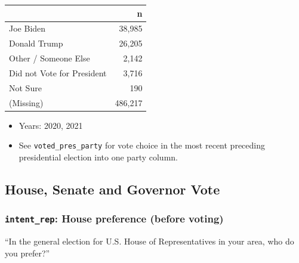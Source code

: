 \documentclass[10pt,article,oneside]{memoir}
\theoremstyle{definition}
\begin{document}
\begin{table}[H]
\centering
\begin{tabular}[t]{lr}
\toprule
 & n\\
\midrule
Joe Biden & 38,985\\
Donald Trump & 26,205\\
Other / Someone Else & 2,142\\
Did not Vote for President & 3,716\\
Not Sure & 190\\
(Missing) & 486,217\\
\bottomrule
\end{tabular}
\end{table}

\begin{itemize}
\tightlist
\item
  Years: 2020, 2021
\item
  See \texttt{voted\_pres\_party} for vote choice in the most recent
  preceding presidential election into one party column.
\end{itemize}

\hypertarget{house-senate-and-governor-vote}{%
\subsection{House, Senate and Governor
Vote}\label{house-senate-and-governor-vote}}

\hypertarget{intent_rep-house-preference-before-voting}{%
\subsubsection{\texorpdfstring{\texttt{intent\_rep}: House preference
(before
voting)}{intent\_rep: House preference (before voting)}}\label{intent_rep-house-preference-before-voting}}

``In the general election for U.S. House of Representatives in your
area, who do you prefer?''
\end{document}
